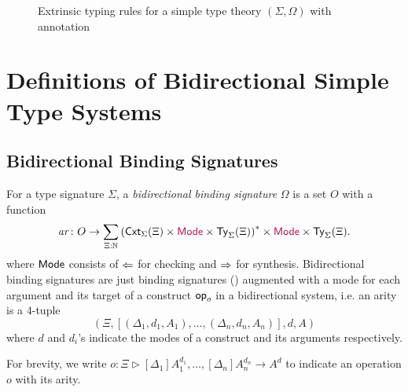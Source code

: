 \documentclass[acmsmall,screen]{acmart}
\theoremstyle{acmdefinition}
\begin{document}
\begin{figure}
  \centering
  \small
  \caption{Extrinsic typing rules for a simple type theory $(\Sigma, \Omega)$ with annotation}
  \label{fig:extrinsic-typing}
\end{figure}

\section{Definitions of Bidirectional Simple Type Systems} 

\subsection{Bidirectional Binding Signatures}

\begin{definition}
  For a type signature $\Sigma$, a \emph{bidirectional binding signature} $\Omega$ is a set $O$ with a function
  \[
    \mathit{ar}\colon O \to \sum_{\Xi : \mathbb{N}} \left(\mathsf{Cxt}_{\Sigma}(\Xi) \times {\mathrel{\textcolor{purple}{\mathsf{Mode}}}} \times \mathsf{Ty}_{\Sigma}(\Xi)\right)^* \times {\mathrel{\textcolor{purple}{\mathsf{Mode}}}} \times \mathsf{Ty}_{\Sigma}(\Xi).
  \]
  where $\mathsf{Mode}$ consists of $\Leftarrow$ for checking and $\Rightarrow$ for synthesis.
  Bidirectional binding signatures are just binding signatures () augmented with a mode for each argument and its target of a construct $\mathsf{op}_o$ in a bidirectional system, i.e.
  an arity is a $4$-tuple
  \[
    \left(\Xi, \left[\left(\Delta_1, d_1, A_1\right), \ldots, \left(\Delta_{n}, d_n, A_{n}\right) \right], d, A\right)
  \]
  where $d$ and $d_i$'s indicate the modes of a construct and its arguments respectively.

  For brevity, we write $o \colon \Xi \rhd [\Delta_1]A_{1}^{d_1}, \ldots, [\Delta_{n}] A^{d_n}_{n} \to A^{d}$ to indicate an operation $o$ with its arity. 
\end{definition}
\end{document}
